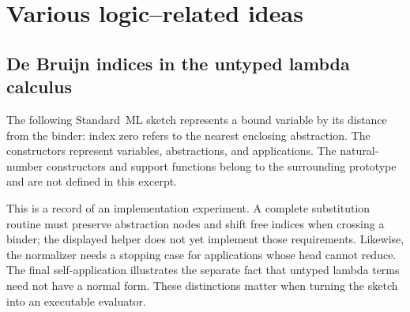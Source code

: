 \chapter{Various logic--related ideas}
\section{De Bruijn indices in the untyped lambda calculus}
The following Standard~ML sketch represents a bound variable by its distance
from the binder: index zero refers to the nearest enclosing abstraction.
The constructors represent variables, abstractions, and applications.
The natural-number constructors and support functions belong to the
surrounding prototype and are not defined in this excerpt.

This is a record of an implementation experiment. A complete substitution
routine must preserve abstraction nodes and shift free indices when crossing
a binder; the displayed helper does not yet implement those requirements.
Likewise, the normalizer needs a stopping case for applications whose head
cannot reduce. The final self-application illustrates the separate fact that
untyped lambda terms need not have a normal form. These distinctions matter
when turning the sketch into an executable evaluator.

